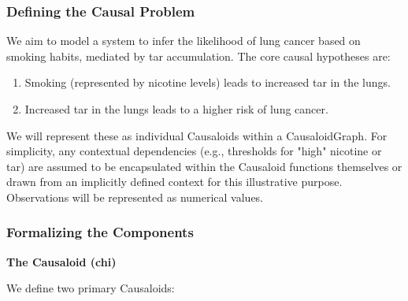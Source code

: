     \subsubsection{Defining the Causal Problem}
    \label{ssec:example_problem_definition}
    We aim to model a system to infer the likelihood of lung cancer based on smoking habits, mediated by tar accumulation. The core causal hypotheses are:
    \begin{enumerate}
        \item Smoking (represented by nicotine levels) leads to increased tar in the lungs.
        \item Increased tar in the lungs leads to a higher risk of lung cancer.
    \end{enumerate}
    We will represent these as individual Causaloids within a CausaloidGraph. For simplicity, any contextual dependencies (e.g., thresholds for "high" nicotine or tar) are assumed to be encapsulated within the Causaloid functions themselves or drawn from an implicitly defined context for this illustrative purpose. Observations will be represented as numerical values.

    \subsubsection{Formalizing the Components}
    \label{ssec:example_formal_components}

\textbf{The Causaloid (chi)}
        
        We define two primary Causaloids:

